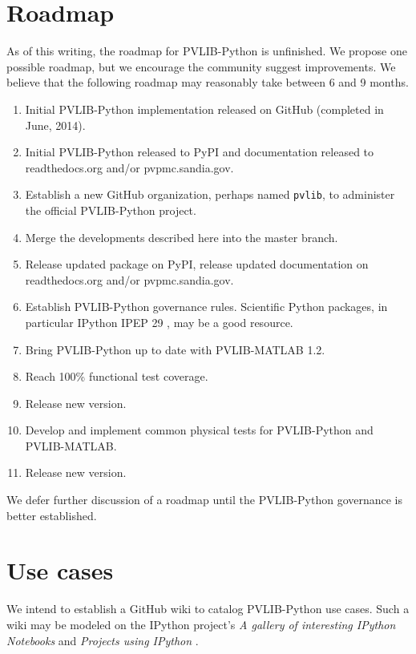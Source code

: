 \documentclass[conference]{IEEEtran}
\begin{document}
\section{Roadmap}

As of this writing, the roadmap for PVLIB-Python is unfinished. 
We propose one possible roadmap, but we encourage the community suggest improvements. 
We believe that the following roadmap may reasonably take between 6 and 9 months. 

\begin{enumerate}
\item Initial PVLIB-Python implementation released on GitHub (completed in June, 2014).
\item Initial PVLIB-Python released to PyPI and documentation released to readthedocs.org and/or pvpmc.sandia.gov.
\item Establish a new GitHub organization, perhaps named \texttt{pvlib}, to administer the official PVLIB-Python project.
\item Merge the developments described here into the master branch.
\item Release updated package on PyPI, release updated documentation on readthedocs.org and/or pvpmc.sandia.gov.
\item Establish PVLIB-Python governance rules. Scientific Python packages, in particular IPython IPEP 29 \cite{ipython-gov}, may be a good resource.
\item Bring PVLIB-Python up to date with PVLIB-MATLAB 1.2.
\item Reach 100\% functional test coverage.
\item Release new version.
\item Develop and implement common physical tests for PVLIB-Python and PVLIB-MATLAB.
\item Release new version.
\end{enumerate}

We defer further discussion of a roadmap until the PVLIB-Python governance is better established.



\section{Use cases}

We intend to establish a GitHub wiki to catalog PVLIB-Python use cases. Such a wiki may be modeled on the IPython project's \emph{A gallery of interesting IPython Notebooks} and \emph{Projects using IPython} \cite{ipythonwiki}. 
\end{document}
